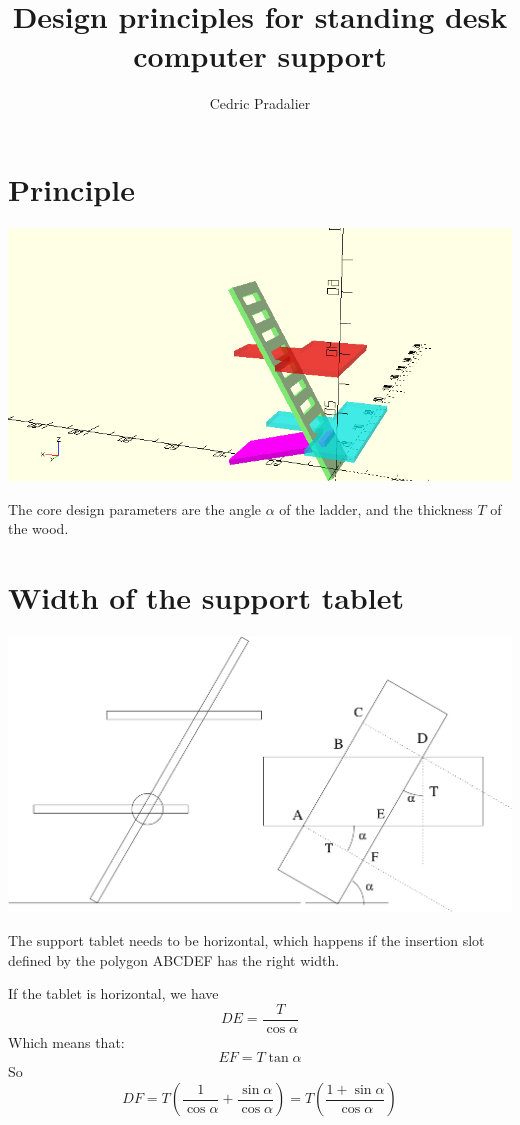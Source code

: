 \documentclass{article}
\title{Design principles for standing desk computer support}
\author{Cedric Pradalier}
\begin{document}
\maketitle

\section{Principle}
\begin{center}
    \includegraphics[width=0.7\columnwidth]{../cad/SupportAssisDebout.png}
\end{center}
The core design parameters are the angle $\alpha$ of the ladder, and the thickness $T$ of the wood.

\section{Width of the support tablet}
\begin{center}
    \includegraphics[width=0.7\columnwidth]{slot1.pdf}
\end{center}
The support tablet needs to be horizontal, which happens if the insertion slot defined by the polygon ABCDEF has the right width.

If the tablet is horizontal, we have
$$DE = \frac{T}{\cos\alpha}$$
Which means that:
$$EF = T \tan\alpha$$
So
\begin{equation}
    \label{eq:tablet-slot}
    DF = T\left(\frac{1}{\cos \alpha} + \frac{\sin \alpha}{\cos\alpha}\right) = 
    T \left(\frac{1 + \sin\alpha}{\cos \alpha}\right)
\end{equation}
\end{document}

